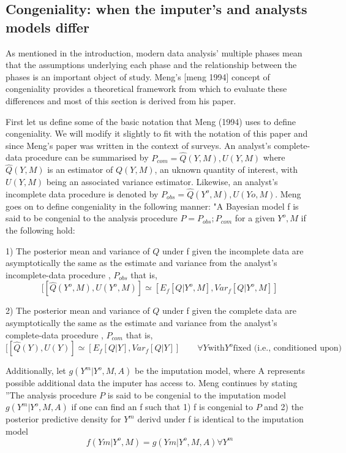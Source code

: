 \documentclass{article}
\begin{document}
	
	\subsection{Congeniality: when the imputer's and analysts models differ}
	As mentioned in the introduction, modern data analysis' multiple phases mean that the assumptions underlying each phase and the relationship between the phases is an important object of study. Meng's [meng 1994] concept of congeniality provides a theoretical framework from which to evaluate these differences and most of this section is derived from his paper.
	
	First let us define some of the basic notation that Meng (1994) uses to define congeniality. We will modify it slightly to fit with the notation of this paper and since Meng's paper was written in the context of surveys. An analyst's complete-data procedure can be summarised by $P_{com} = {\hat{Q}(Y, M), U(Y, M)}$ where $\hat{Q}(Y, M)$ is an estimator of $Q(Y, M)$, an uknown quantity of interest, with $U(Y, M)$ being an associated variance estimator. Likewise, an analyst's incomplete data procedure is denoted by $P_{obs} = {\hat{Q}(Y^{o}, M), U(Y{o}, M)}$. Meng goes on to define congeniality in the following manner: "A Bayesian model f is said to be congenial to the analysis procedure $P = {P_{obs};P_{com}}$ for a given ${Y^{o}, M}$ if the following hold:
	
	1) The posterior mean and variance of $Q$ under
	f given the incomplete data are asymptotically the
	same as the estimate and variance from the analyst's
	incomplete-data procedure , $P_{obs}$ that is, $$[[\hat{Q}(Y^{o}, M), U(Y^{o}, M)]\simeq [E_{f}[Q|{Y^{o}, M}], Var_{f}[Q|{Y^{o}, M}]]$$
	
	2)  The posterior mean and variance of $Q$ under
	f given the complete data are asymptotically the
	same as the estimate and variance from the analyst's
	complete-data procedure , $P_{com}$ that is, $$[[\hat{Q}(Y), U(Y)]\simeq [E_{f}[Q|{Y}], Var_{f}[Q|{Y}]]\qquad \forall Y\textrm{with}Y^{o}\textrm{fixed (i.e., conditioned upon)}$$
	
	Additionally, let $g(Y^{m}|{Y^{o}, M}, A)$ be the imputation model, where A represents possible additional data the imputer has access to. Meng continues by stating ''The analysis procedure $P$ is said to be congenial to the imputation model $g(Y^{m}|{Y^{o}, M}, A)$ if one can find an f such that 1) f is congenial to $P$ and 2) the posterior predictive density for $Y^{m}$ derivd under f is identical to the imputation model $$f(Y{m}|{Y^{o}, M}) = g(Y{m}|{Y^{o}, M}, A) \forall Y^{m}$$
	
\end{document}

